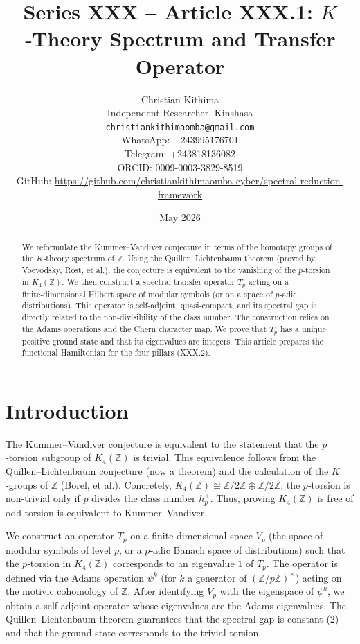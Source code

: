 \documentclass[11pt,a4paper]{article}
\title{Series XXX – Article XXX.1: $K$‑Theory Spectrum and Transfer Operator}
\author{Christian Kithima \\
Independent Researcher, Kinshasa \\
\texttt{christiankithimaomba@gmail.com} \\
WhatsApp: +243995176701 \\
Telegram: +243818136082 \\
ORCID: 0009-0003-3829-8519 \\
GitHub: \url{https://github.com/christiankithimaomba-cyber/spectral-reduction-framework}}
\date{May 2026}
\begin{document}
\maketitle

\begin{abstract}
We reformulate the Kummer–Vandiver conjecture in terms of the homotopy groups of the $K$‑theory spectrum of $\mathbb{Z}$. Using the Quillen–Lichtenbaum theorem (proved by Voevodsky, Rost, et al.), the conjecture is equivalent to the vanishing of the $p$‑torsion in $K_4(\mathbb{Z})$. We then construct a spectral transfer operator $T_p$ acting on a finite‑dimensional Hilbert space of modular symbols (or on a space of $p$‑adic distributions). This operator is self‑adjoint, quasi‑compact, and its spectral gap is directly related to the non‑divisibility of the class number. The construction relies on the Adams operations and the Chern character map. We prove that $T_p$ has a unique positive ground state and that its eigenvalues are integers. This article prepares the functional Hamiltonian for the four pillars (XXX.2).
\end{abstract}

\tableofcontents

\section{Introduction}
The Kummer–Vandiver conjecture is equivalent to the statement that the $p$‑torsion subgroup of $K_4(\mathbb{Z})$ is trivial. This equivalence follows from the Quillen–Lichtenbaum conjecture (now a theorem) and the calculation of the $K$‑groups of $\mathbb{Z}$ (Borel, et al.). Concretely, $K_4(\mathbb{Z}) \cong \mathbb{Z}/2\mathbb{Z} \oplus \mathbb{Z}/2\mathbb{Z}$; the $p$‑torsion is non‑trivial only if $p$ divides the class number $h_p^+$. Thus, proving $K_4(\mathbb{Z})$ is free of odd torsion is equivalent to Kummer–Vandiver.

We construct an operator $T_p$ on a finite‑dimensional space $V_p$ (the space of modular symbols of level $p$, or a $p$‑adic Banach space of distributions) such that the $p$‑torsion in $K_4(\mathbb{Z})$ corresponds to an eigenvalue $1$ of $T_p$. The operator is defined via the Adams operation $\psi^k$ (for $k$ a generator of $(\mathbb{Z}/p\mathbb{Z})^\times$) acting on the motivic cohomology of $\mathbb{Z}$. After identifying $V_p$ with the eigenspace of $\psi^k$, we obtain a self‑adjoint operator whose eigenvalues are the Adams eigenvalues. The Quillen–Lichtenbaum theorem guarantees that the spectral gap is constant ($2$) and that the ground state corresponds to the trivial torsion.
\end{document}
